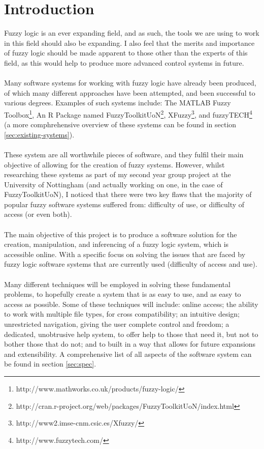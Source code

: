 \section{Introduction}
Fuzzy logic is an ever expanding field, and as such, the tools we are using to work in this field should also be expanding. I also feel that the merits and importance of fuzzy logic should be made apparent to those other than the experts of this field, as this would help to produce more advanced control systems in future.\\
\\
Many software systems for working with fuzzy logic have already been produced, of which many different approaches have been attempted, and been successful to various degrees. Examples of such systems include: The MATLAB Fuzzy Toolbox\footnote{http://www.mathworks.co.uk/products/fuzzy-logic/}, An R Package named  FuzzyToolkitUoN\footnote{http://cran.r-project.org/web/packages/FuzzyToolkitUoN/index.html}, XFuzzy\footnote{http://www2.imse-cnm.csic.es/Xfuzzy/}, and fuzzyTECH\footnote{http://www.fuzzytech.com/} (a more comphrehensive overview of these systems can be found in section \ref{sec:existing-systems}).\\
\\
These system are all worthwhile pieces of software, and they fulfil their main objective of allowing for the creation of fuzzy systems. However, whilst researching these systems as part of my second year group project at the University of Nottingham (and actually working on one, in the case of FuzzyToolkitUoN), I noticed that there were two key flaws that the majority of popular fuzzy software systems suffered from: difficulty of use, or difficulty of access (or even both). \\
\\
The main objective of this project is to produce a software solution for the creation, manipulation, and inferencing of a fuzzy logic system, which is accessible online. With a specific focus on solving the issues that are faced by fuzzy logic software systems that are currently used (difficulty of access and use). \\
\\
Many different techniques will be employed in solving these fundamental problems, to hopefully create a system that is as easy to use, and as easy to access as possible. Some of these techniques will include: online access; the ability to work with multiple file types, for cross compatibility; an intuitive design; unrestricted navigation, giving the user complete control and freedom; a dedicated, unobtrusive help system, to offer help to those that need it, but not to bother those that do not; and to built in a way that allows for future expansions and extensibility. A comprehensive list of all aspects of the software system can be found in section \ref{sec:spec}.\\
